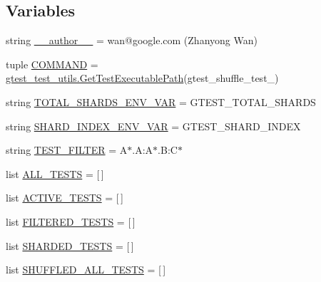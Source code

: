 \subsection*{Variables}
\begin{DoxyCompactItemize}
\item 
string \hyperlink{namespacegtest__shuffle__test_a86e1668fd0984b5a9fccd0a2da540ad1}{\+\_\+\+\_\+author\+\_\+\+\_\+} = \textquotesingle{}wan@google.\+com (Zhanyong Wan)\textquotesingle{}
\item 
tuple \hyperlink{namespacegtest__shuffle__test_a743518d873bfee85b04c5e87c27d60e1}{C\+O\+M\+M\+A\+N\+D} = \hyperlink{namespacegtest__test__utils_a1bdf3cac86afa675ed37629b183048e9}{gtest\+\_\+test\+\_\+utils.\+Get\+Test\+Executable\+Path}(\textquotesingle{}gtest\+\_\+shuffle\+\_\+test\+\_\+\textquotesingle{})
\item 
string \hyperlink{namespacegtest__shuffle__test_a29088c2bb51a4550fa2a668d972f973a}{T\+O\+T\+A\+L\+\_\+\+S\+H\+A\+R\+D\+S\+\_\+\+E\+N\+V\+\_\+\+V\+A\+R} = \textquotesingle{}G\+T\+E\+S\+T\+\_\+\+T\+O\+T\+A\+L\+\_\+\+S\+H\+A\+R\+D\+S\textquotesingle{}
\item 
string \hyperlink{namespacegtest__shuffle__test_ab3215c444f0e35ae2764f862194fe743}{S\+H\+A\+R\+D\+\_\+\+I\+N\+D\+E\+X\+\_\+\+E\+N\+V\+\_\+\+V\+A\+R} = \textquotesingle{}G\+T\+E\+S\+T\+\_\+\+S\+H\+A\+R\+D\+\_\+\+I\+N\+D\+E\+X\textquotesingle{}
\item 
string \hyperlink{namespacegtest__shuffle__test_ac2a2a6c7c009be4f94bc9c8bc0c51bb5}{T\+E\+S\+T\+\_\+\+F\+I\+L\+T\+E\+R} = \textquotesingle{}A$\ast$.A\+:\+A$\ast$.B\+:\+C$\ast$\textquotesingle{}
\item 
list \hyperlink{namespacegtest__shuffle__test_aede96442ff7a7c9ac9a8baaaeb48e86c}{A\+L\+L\+\_\+\+T\+E\+S\+T\+S} = \mbox{[}$\,$\mbox{]}
\item 
list \hyperlink{namespacegtest__shuffle__test_acd6d827819dcc06b9bf061cd4849b082}{A\+C\+T\+I\+V\+E\+\_\+\+T\+E\+S\+T\+S} = \mbox{[}$\,$\mbox{]}
\item 
list \hyperlink{namespacegtest__shuffle__test_a35011532d6bd14ac29c891111ce1a911}{F\+I\+L\+T\+E\+R\+E\+D\+\_\+\+T\+E\+S\+T\+S} = \mbox{[}$\,$\mbox{]}
\item 
list \hyperlink{namespacegtest__shuffle__test_ad9bd126c3dc9894a3977a907e97e71e8}{S\+H\+A\+R\+D\+E\+D\+\_\+\+T\+E\+S\+T\+S} = \mbox{[}$\,$\mbox{]}
\item 
list \hyperlink{namespacegtest__shuffle__test_a6128f9c522f40c64ffb3917ff17080b8}{S\+H\+U\+F\+F\+L\+E\+D\+\_\+\+A\+L\+L\+\_\+\+T\+E\+S\+T\+S} = \mbox{[}$\,$\mbox{]}

\end{DoxyCompactItemize}

